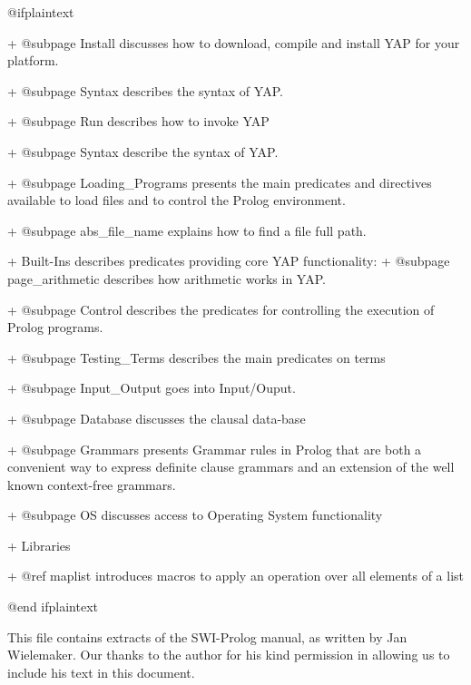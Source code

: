 @ifplaintext
 

  + @subpage Install discusses how to download, compile and install YAP for your platform.

  + @subpage Syntax describes the syntax of YAP.

  + @subpage Run describes how to invoke YAP

  + @subpage Syntax describe the syntax of YAP.

  + @subpage Loading_Programs presents the main predicates and
  directives available to load files and to control the Prolog environment.

        + @subpage abs_file_name explains how to find a file full path.

  + Built-Ins describes predicates providing core YAP functionality:
        + @subpage page_arithmetic describes how arithmetic works in YAP.

        + @subpage Control describes the predicates for controlling the execution of Prolog programs.

        + @subpage Testing_Terms describes the main predicates on terms

        + @subpage  Input_Output goes into Input/Ouput.
		
        + @subpage Database discusses the clausal data-base

        + @subpage Grammars presents Grammar rules in Prolog that are
     both a  convenient way to express definite clause grammars and
     an extension of the well known context-free grammars.

        + @subpage OS discusses access to Operating System functionality

  + Libraries

        + @ref maplist introduces macros to apply an operation over
          all elements of a list


@end ifplaintext


This file contains extracts of the SWI-Prolog manual, as written by Jan
Wielemaker. Our thanks to the author for his kind permission in allowing
us to include his text in this document.

